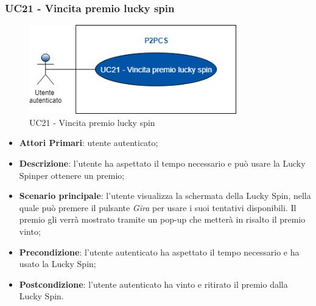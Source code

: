 \subsubsection{UC21 - Vincita premio lucky spin}
\begin{figure}[h]
	\includegraphics[width=9cm]{res/images/uc21.png}
	\centering
	\caption{UC21 - Vincita premio lucky spin}
\end{figure}
\begin{itemize}
	\item \textbf{Attori Primari}: utente autenticato;
	\item \textbf{Descrizione}: l'utente ha aspettato il tempo necessario e può usare la Lucky Spin\glosp per ottenere un premio;	
	\item \textbf{Scenario principale}: l'utente visualizza la schermata della Lucky Spin, nella quale può premere il pulsante \textit{Gira} per usare i suoi tentativi disponibili. Il premio gli verrà mostrato tramite un pop-up che metterà in risalto il premio vinto;
	\item \textbf{Precondizione}: l'utente autenticato ha aspettato il tempo necessario e ha usato la Lucky Spin;
	\item \textbf{Postcondizione}: l'utente autenticato ha vinto e ritirato il premio dalla Lucky Spin.
\end{itemize}
